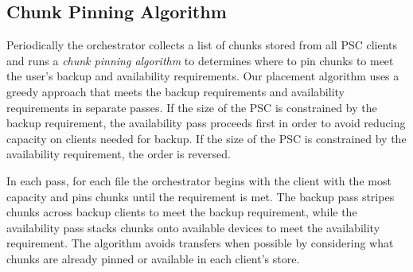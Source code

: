 \subsection{Chunk Pinning Algorithm}
\label{sec-design-algorithm}

Periodically the orchestrator collects a list of chunks stored from
all PSC clients and runs a \textit{chunk pinning algorithm} to determines
where to pin chunks to meet the user's backup and availability requirements.
Our placement algorithm uses a greedy approach that meets the backup
requirements and availability requirements in separate passes. If the size of
the PSC is constrained by the backup requirement, the availability pass
proceeds first in order to avoid reducing capacity on clients needed for
backup. If the size of the PSC is constrained by the availability
requirement, the order is reversed.

In each pass, for each file the orchestrator begins with the client with the
most capacity and pins chunks until the requirement is met. The backup pass
stripes chunks across backup clients to meet the backup requirement, while the
availability pass stacks chunks onto available devices to meet the availability
requirement. The algorithm avoids transfers when possible by considering what
chunks are already pinned or available in each client's store.

